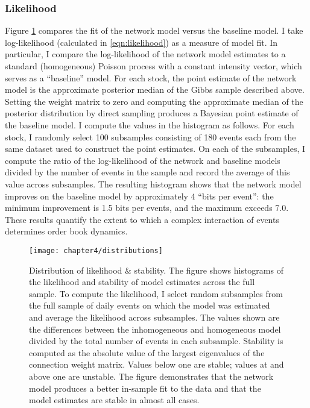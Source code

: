 		\subsubsection{Likelihood}
			Figure \ref{fig:distributions} compares the fit of the network model versus the baseline model. I take log-likelihood (calculated in \eqref{eqn:likelihood}) as a measure of model fit. In particular, I compare the log-likelihood of the network model estimates to a standard (homogeneous) Poisson process with a constant intensity vector, which serves as a “baseline” model. For each stock, the point estimate of the network model is the approximate posterior median of the Gibbs sample described above. Setting the weight matrix to zero and computing the approximate median of the posterior distribution by direct sampling produces a Bayesian point estimate of the baseline model. I compute the values in the histogram as follows. For each stock, I randomly select 100 subsamples consisting of 180 events each from the same dataset used to construct the point estimates. On each of the subsamples, I compute the ratio of the log-likelihood of the network and baseline models divided by the number of events in the sample and record the average of this value across subsamples. The resulting histogram shows that the network model improves on the baseline model by approximately 4 ``bits per event'': the minimum improvement is 1.5 bits per events, and the maximum exceeds 7.0. These results quantify the extent to which a complex interaction of events determines order book dynamics.

			\begin{figure}[p]
				\small
				\linespread{1}
				\centering
				\texttt{[image: chapter4/distributions]}
				\captionsetup{skip=-20pt, position=below, font=footnotesize, justification=justified, width=\linewidth}
				\caption[Distribution of likelihood \& stability]{Distribution of likelihood \& stability. The figure shows histograms of the likelihood and stability of model estimates across the full sample. To compute the likelihood, I select random subsamples from the full sample of daily events on which the model was estimated and average the likelihood across subsamples. The values shown are the differences between the inhomogeneous and homogeneous model divided by the total number of events in each subsample. Stability is computed as the absolute value of the largest eigenvalues of the connection weight matrix. Values below one are stable; values at and above one are unstable.  The figure demonstrates that the network model produces a better in-sample fit to the data and that the model estimates are stable in almost all cases.}
				\label{fig:distributions}
			\end{figure}

